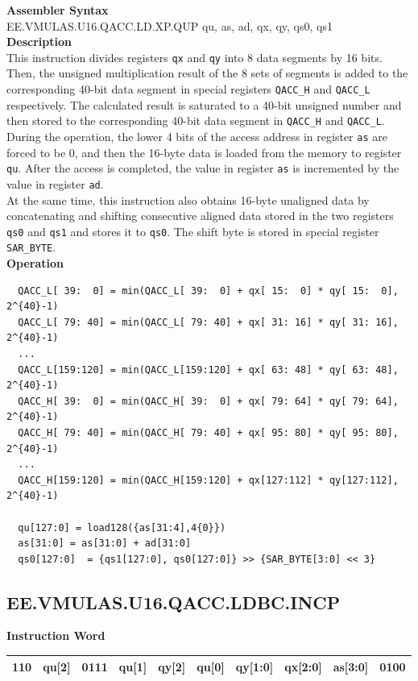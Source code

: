 \textbf{Assembler Syntax} \\
EE.VMULAS.U16.QACC.LD.XP.QUP qu, as, ad, qx, qy, qs0, qs1 \\
\textbf{Description} \\
This instruction divides registers \lstinline{qx} and \lstinline{qy} into 8 data segments by 16 bits. Then, the unsigned multiplication result of the 8 sets of segments is added to the corresponding 40-bit data segment in special registers \lstinline{QACC_H} and \lstinline{QACC_L} respectively. The calculated result is saturated to a 40-bit unsigned number and then stored to the corresponding 40-bit data segment in \lstinline{QACC_H} and \lstinline{QACC_L}.\\
During the operation, the lower 4 bits of the access address in register \lstinline{as} are forced to be 0, and then the 16-byte data is loaded from the memory to register \lstinline{qu}. After the access is completed, the value in register \lstinline{as} is incremented by the value in register \lstinline{ad}.\\
At the same time, this instruction also obtains 16-byte unaligned data by concatenating and shifting consecutive aligned data stored in the two registers \lstinline{qs0} and \lstinline{qs1} and stores it to \lstinline{qs0}. The shift byte is stored in special register \lstinline{SAR_BYTE}.\\
\textbf{Operation}
\begin{lstlisting}
  QACC_L[ 39:  0] = min(QACC_L[ 39:  0] + qx[ 15:  0] * qy[ 15:  0], 2^{40}-1)
  QACC_L[ 79: 40] = min(QACC_L[ 79: 40] + qx[ 31: 16] * qy[ 31: 16], 2^{40}-1)
  ...
  QACC_L[159:120] = min(QACC_L[159:120] + qx[ 63: 48] * qy[ 63: 48], 2^{40}-1)
  QACC_H[ 39:  0] = min(QACC_H[ 39:  0] + qx[ 79: 64] * qy[ 79: 64], 2^{40}-1)
  QACC_H[ 79: 40] = min(QACC_H[ 79: 40] + qx[ 95: 80] * qy[ 95: 80], 2^{40}-1)
  ...
  QACC_H[159:120] = min(QACC_H[159:120] + qx[127:112] * qy[127:112], 2^{40}-1)

  qu[127:0] = load128({as[31:4],4{0}})
  as[31:0] = as[31:0] + ad[31:0]
  qs0[127:0]  = {qs1[127:0], qs0[127:0]} >> {SAR_BYTE[3:0] << 3}
\end{lstlisting}

\clearpage
\subsection{EE.VMULAS.U16.QACC.LDBC.INCP}\label{instruction:EEVMULASU16QACCLDBCINCP}
\setlength\tabcolsep{6pt}
\textbf{Instruction Word} \\
\begin{tabular}{|c|c|c|c|c|c|c|c|c|c|}
	\hline
	110 & qu[2] & 0111 & qu[1] & qy[2] & qu[0] & qy[1:0] & qx[2:0] & as[3:0] & 0100 \\
	\hline
\end{tabular}

